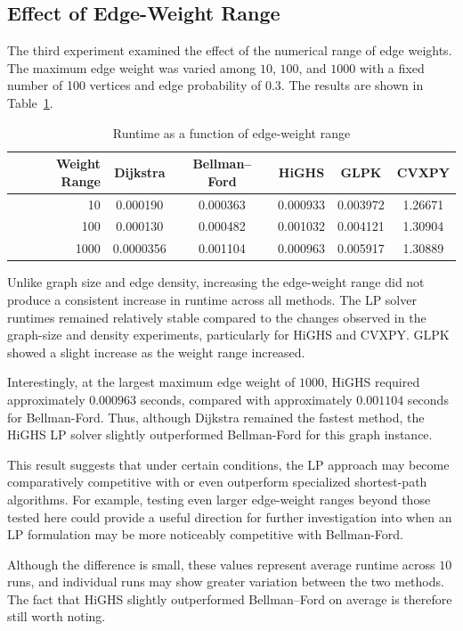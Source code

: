 \documentclass[12pt]{report}
\begin{document}
\subsection{Effect of Edge-Weight Range}

The third experiment examined the effect of the numerical range of edge weights. The maximum edge weight was varied among $10$, $100$, and $1000$ with a fixed number of 100 vertices and edge probability of $0.3$. The results are shown in Table~\ref{tab:weight_runtime}.

\begin{table}[H]
\centering
\caption{Runtime as a function of edge-weight range}
\label{tab:weight_runtime}
\begin{tabular}{rccccc}
\hline
\textbf{Weight Range} & \textbf{Dijkstra} & \textbf{Bellman--Ford} &
\textbf{HiGHS} & \textbf{GLPK} & \textbf{CVXPY} \\
\hline
10   & 0.000190 & 0.000363 & 0.000933 & 0.003972 & 1.26671 \\
100  & 0.000130 & 0.000482 & 0.001032 & 0.004121 & 1.30904 \\
1000 & 0.0000356 & 0.001104 & 0.000963 & 0.005917 & 1.30889 \\
\hline
\end{tabular}
\end{table}

Unlike graph size and edge density, increasing the edge-weight range did not produce a consistent increase in runtime across all methods. The LP solver runtimes remained relatively stable compared to the changes observed in the graph-size and density experiments, particularly for HiGHS and CVXPY. GLPK showed a slight increase as the weight range increased.

Interestingly, at the largest maximum edge weight of $1000$, HiGHS required approximately $0.000963$ seconds, compared with approximately $0.001104$ seconds for Bellman-Ford. Thus, although Dijkstra remained the fastest method, the HiGHS LP solver slightly outperformed Bellman-Ford for this graph instance. 

This result suggests that under certain conditions, the LP approach may become comparatively competitive with or even outperform specialized shortest-path algorithms. For example, testing even larger edge-weight ranges beyond those tested here could provide a useful direction for further investigation into when an LP formulation may be more noticeably competitive with Bellman-Ford.

Although the difference is small, these values represent average runtime across $10$ runs, and individual runs may show greater variation between the two methods. The fact that HiGHS slightly outperformed Bellman--Ford on average is therefore still worth noting. 
\end{document}
